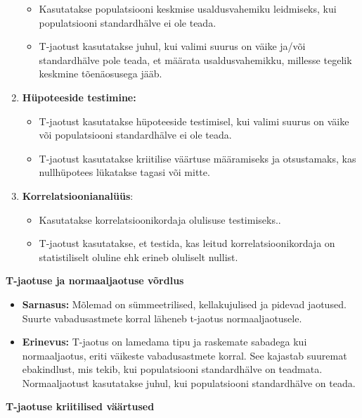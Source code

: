 \documentclass[
]{book}
\providecommand{\tightlist}{%
  \setlength{\itemsep}{0pt}\setlength{\parskip}{0pt}}
\begin{document}
\begin{enumerate}
  \begin{itemize}
  \tightlist
  \item
    Kasutatakse populatsiooni keskmise usaldusvahemiku leidmiseks, kui populatsiooni standardhälve ei ole teada.
  \item
    T-jaotust kasutatakse juhul, kui valimi suurus on väike ja/või standardhälve pole teada, et määrata usaldusvahemikku, millesse tegelik keskmine tõenäosusega jääb.
  \end{itemize}
\item
  \textbf{Hüpoteeside testimine:}

  \begin{itemize}
  \tightlist
  \item
    T-jaotust kasutatakse hüpoteeside testimisel, kui valimi suurus on väike või populatsiooni standardhälve ei ole teada.
  \item
    T-jaotust kasutatakse kriitilise väärtuse määramiseks ja otsustamaks, kas nullhüpotees lükatakse tagasi või mitte.
  \end{itemize}
\item
  \textbf{Korrelatsioonianalüüs}:

  \begin{itemize}
  \tightlist
  \item
    Kasutatakse korrelatsioonikordaja olulisuse testimiseks..
  \item
    T-jaotust kasutatakse, et testida, kas leitud korrelatsioonikordaja on statistiliselt oluline ehk erineb oluliselt nullist.
  \end{itemize}
\end{enumerate}

\textbf{T-jaotuse ja normaaljaotuse võrdlus}

\begin{itemize}
\tightlist
\item
  \textbf{Sarnasus:} Mõlemad on sümmeetrilised, kellakujulised ja pidevad jaotused. Suurte vabadusastmete korral läheneb t-jaotus normaaljaotusele.
\item
  \textbf{Erinevus:} T-jaotus on lamedama tipu ja raskemate sabadega kui normaaljaotus, eriti väikeste vabadusastmete korral. See kajastab suuremat ebakindlust, mis tekib, kui populatsiooni standardhälve on teadmata. Normaaljaotust kasutatakse juhul, kui populatsiooni standardhälve on teada.
\end{itemize}

\textbf{T-jaotuse kriitilised väärtused}
\end{document}
